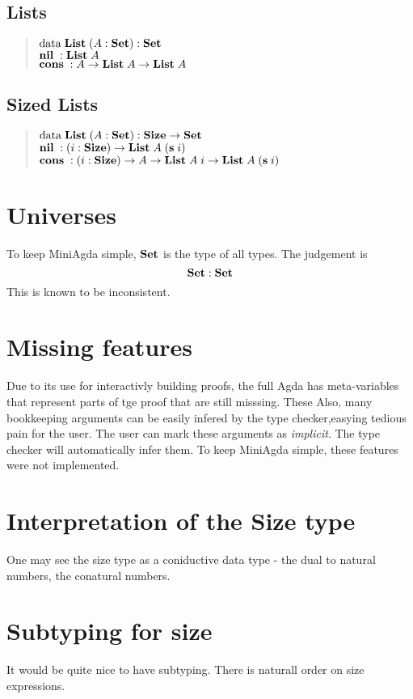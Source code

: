 \subsection{Lists}
\begin{quote}
$\mathrm{data}\; \mathbf{List}\; ( A : \mathbf{Set} ) : \mathbf{Set} $ 
\\
$\mathbf{nil}\; : \mathbf{List}\; A  $
\\
$\mathbf{cons}\; : A \rightarrow \mathbf{List}\; A \rightarrow \mathbf{List}\; A $
\end{quote}
\subsection{Sized Lists}
\begin{quote}
$\mathrm{data}\; \mathbf{List}\; ( A : \mathbf{Set} ) : \mathbf{Size} \rightarrow \mathbf{Set} $ 
\\
$\mathbf{nil}\; : ( i : \mathbf{Size} ) \rightarrow  \mathbf{List}\; A \; (\mathbf{s}\; i) $
\\
$\mathbf{cons}\; : ( i : \mathbf{Size} ) \rightarrow  A \rightarrow \mathbf{List}\; A \; i \rightarrow \mathbf{List}\; A \; (\mathbf{s}\; i) $
\end{quote}

\section{Universes}
To keep MiniAgda simple, $\mathbf{Set}$ is the type of all types.
The judgement is
\[\mathbf{Set} : \mathbf{Set} \]
This is known to be inconsistent.
\section{Missing features}
Due to its use for interactivly building proofs, the full Agda has meta-variables that represent parts of tge proof that are still misssing. These 
Also, many bookkeeping arguments can be easily infered by the type checker,easying tedious pain for the user.
The user can mark these arguments as \emph{implicit}. The type checker will automatically infer them.
To keep MiniAgda simple, these features were not implemented.

\section{Interpretation of the Size type}
One may see the size type as a coniductive data type - the dual to natural numbers, the conatural numbers.

\section{Subtyping for size}
It would be quite nice to have subtyping.
There is naturall order on size expressions.

